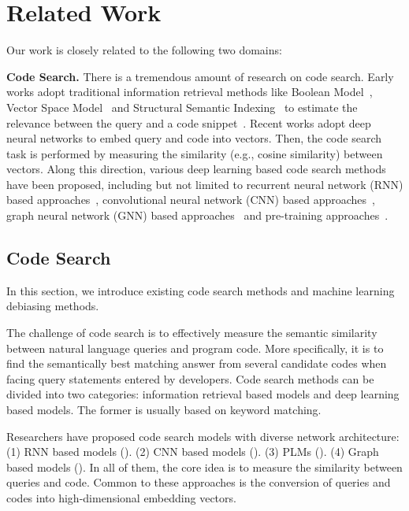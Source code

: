 
\section{Related Work}


Our work is closely related to the following two domains:

\vspace{3pt}
\noindent\textbf{Code Search.} There is a tremendous amount of research on code search. 
Early works adopt traditional information retrieval methods like Boolean Model~\cite{SaltonFW83}, Vector Space Model~\cite{SaltonWY75} 
and Structural Semantic Indexing~\citep{Dumais04} to estimate 
the relevance between the query and a code snippet~\citep{LvZLWZZ15,BajracharyaOL10}.
Recent works adopt deep neural networks to embed query and code into vectors.
Then, the code search task is performed by measuring the similarity 
(e.g., cosine similarity) between vectors.
Along this direction, various deep learning based code search methods have been proposed, 
including but not limited to 
recurrent neural network (RNN) based approaches~\citep{DeepCS}, 
convolutional neural network (CNN) based approaches~\citep{CQIL, ShuaiX0Y0L20}, 
graph neural network (GNN) based approaches~\citep{WanSSXZ0Y19}
and pre-training approaches~\citep{CodeBERT, GraphCodeBERT, GuoLDW0022}.


\subsection{Code Search}
In this section, we introduce existing code search methods and machine learning debiasing methods. 

The challenge of code search is to effectively measure the 
semantic similarity between natural language queries and program code. 
More specifically, it is to find the semantically best matching 
answer from several candidate codes when facing query statements 
entered by developers. Code search methods can be divided into two categories: 
information retrieval based models and deep learning based models. 
The former is usually based on keyword matching. 

Researchers have proposed code search models with diverse network architecture: 
(1) RNN based models (\citep{DeepCS}). (2) CNN based models (\citep{CQIL, ShuaiX0Y0L20}). (3) PLMs (\citep{CodeBERT, CoCLR, GuoLDW0022}). 
(4) Graph based models (\citep{GraphCodeBERT, GuCM21}).
In all of them, the core idea is to measure the similarity between queries and code. 
Common to these approaches is the conversion of queries and 
codes into high-dimensional embedding vectors.

